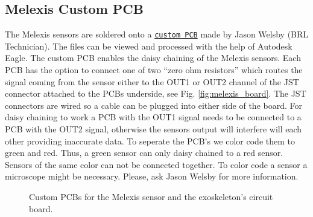 \subsection{Melexis Custom PCB}
The Melexis sensors are soldered onto a
\texttt{\href{https://tinyurl.com/46496kpn}{custom PCB}} made by Jason Welsby
(BRL Technician). The files can be viewed and processed with the 
help of Autodesk Eagle. The custom PCB enables the daisy chaining of the 
Melexis sensors. Each PCB has the option to connect one of two
“zero ohm resistors” which routes the signal coming from the sensor either to
the OUT1 or OUT2 channel of the JST connector attached to the PCBs
underside, see Fig. \ref{fig:melexis_board}. The JST connectors are wired so a
cable can be plugged into either side of the board. For daisy chaining to
work a PCB with the OUT1 signal needs to be connected to a PCB with the
OUT2 signal, otherwise the sensors output will interfere will each other
providing inaccurate data. To seperate the PCB's we color code them to 
green and red. Thus, a green sensor can only daisy chained to a red sensor. 
Sensors of the same color can not be connected together. To color code a 
sensor a microscope might be necessary. Please, ask Jason Welsby for more
information.
\begin{figure}[t]
    \centering
    \qquad
    \caption{Custom PCBs for the Melexis sensor and the exoskeleton's circuit board.}
    \label{fig:pcbs}
\end{figure}

